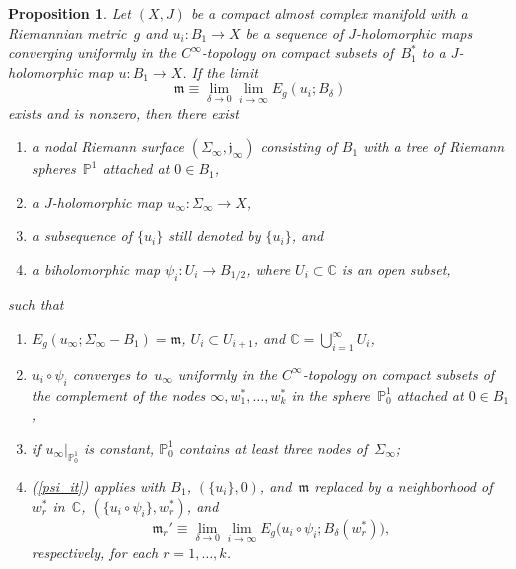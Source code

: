 \documentclass[11pt]{article}
\numberwithin{equation}{section}
\newtheorem{prp}[thm]{Proposition}
\theoremstyle{definition}
\def\BE#1{\begin{equation}\label{#1}}
\def\EE{\end{equation}}
\def\eref#1{(\ref{#1})}
\def\lra{\longrightarrow}
\def\C{\mathbb{C}}
\def\fj{\mathfrak j}
\def\fm{\mathfrak m}
\def\P{\mathbb{P}}
\def\de{\delta}
\def\Si{\Sigma}
\def\i{\infty}
\begin{document}
\begin{prp}\label{EnerPres_prp}
Let $(X,J)$ be a compact almost complex manifold with a Riemannian metric~$g$
and $u_i\!:B_1\!\lra\!X$ be a sequence of $J$-holomorphic maps converging
uniformly in the $C^{\i}$-topology on compact subsets of~$B_1^*$
to a $J$-holomorphic map $u\!:B_1\!\lra\!X$. If the limit
\BE{fmdfn_e2}\fm\equiv\lim_{\de\lra0}\lim_{i\lra\i}E_g(u_i;B_{\de})\EE
exists and is nonzero, then there exist
\begin{enumerate}[ref=\arabic*,label=(\arabic*),leftmargin=*]

\item a nodal Riemann surface $(\Si_{\i},\fj_{\i})$ consisting of $B_1$ with 
a tree of Riemann spheres~$\P^1$ attached at $0\!\in\!B_1$,

\item a $J$-holomorphic map $u_{\i}\!:\Si_{\i}\!\lra\!X$,
 
\item a subsequence of $\{u_i\}$ still denoted by $\{u_i\}$, and

\item\label{psi_it} a biholomorphic map $\psi_i\!:U_i\!\lra\!B_{1/2}$, 
where $U_i\!\subset\!\C$ is an open subset,  

\end{enumerate}
such that 
\begin{enumerate}[label=(\ref{psi_it}\alph*),leftmargin=*]

\item\label{Ccov_it} $E_g(u_{\i};\Si_{\i}\!-\!B_1)=\fm$, 
$U_i\!\subset\!U_{i+1}$, and $\C=\bigcup_{i=1}^{\i}U_i$,

\item\label{vcon_it} $u_i\!\circ\!\psi_i$ converges to~$u_{\i}$ uniformly 
in the $C^{\i}$-topology  on compact subsets of the complement of the nodes 
$\i,w_1^*,\ldots,w_k^*$  in the sphere~$\P_0^1$ attached at $0\!\in\!B_1$,

\item\label{stab_it}  if $u_{\i}|_{\P^1_0}$ is constant, 
$\P^1_0$ contains at least three nodes of~$\Si_{\i}$;

\item \eref{psi_it} applies with $B_1$, $(\{u_i\},0)$,  and~$\fm$
replaced by  a neighborhood of~$w_r^*$ in~$\C$, $(\{u_i\!\circ\!\psi_i\},w_r^*)$, and 
\BE{fmdfn_e3}\fm_r'\equiv\lim_{\de\lra0}\lim_{i\lra\i}
E_g\big(u_i\!\circ\!\psi_i;B_{\de}(w_r^*)\big),\EE
respectively, for each $r\!=\!1,\ldots,k$.

\end{enumerate}
\end{prp}
\end{document}
